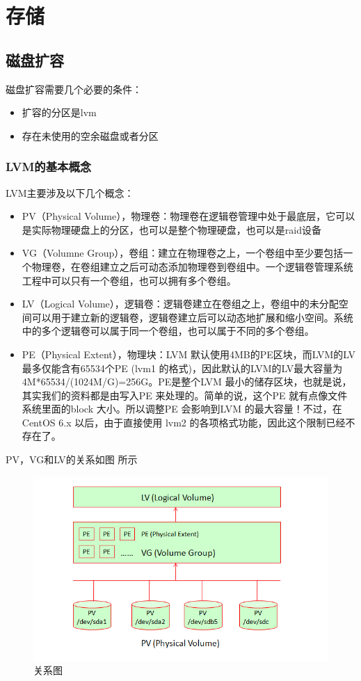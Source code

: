 \chapter{存储}

\section{磁盘扩容}
磁盘扩容需要几个必要的条件：
\begin{itemize}
  \item 扩容的分区是lvm
  \item 存在未使用的空余磁盘或者分区
\end{itemize}

\subsection{LVM的基本概念}
LVM主要涉及以下几个概念：
\begin{itemize}
  \item PV（Physical Volume），物理卷：物理卷在逻辑卷管理中处于最底层，它可以是实际物理硬盘上的分区，也可以是整个物理硬盘，也可以是raid设备
  \item VG（Volumne Group），卷组：建立在物理卷之上，一个卷组中至少要包括一个物理卷，在卷组建立之后可动态添加物理卷到卷组中。一个逻辑卷管理系统工程中可以只有一个卷组，也可以拥有多个卷组。
  \item LV（Logical Volume），逻辑卷：逻辑卷建立在卷组之上，卷组中的未分配空间可以用于建立新的逻辑卷，逻辑卷建立后可以动态地扩展和缩小空间。系统中的多个逻辑卷可以属于同一个卷组，也可以属于不同的多个卷组。
  \item PE（Physical Extent），物理块：LVM 默认使用4MB的PE区块，而LVM的LV最多仅能含有65534个PE (lvm1 的格式)，因此默认的LVM的LV最大容量为4M*65534/(1024M/G)=256G。PE是整个LVM 最小的储存区块，也就是说，其实我们的资料都是由写入PE 来处理的。简单的说，这个PE 就有点像文件系统里面的block 大小。所以调整PE 会影响到LVM 的最大容量！不过，在 CentOS 6.x 以后，由于直接使用 lvm2 的各项格式功能，因此这个限制已经不存在了。
\end{itemize}

PV，VG和LV的关系如图 所示
\begin{figure}[H]
  \centering
  \includegraphics[width=\linewidth]{lvm.png}
  \caption{关系图}
  \label{fig:lvm}
\end{figure}

